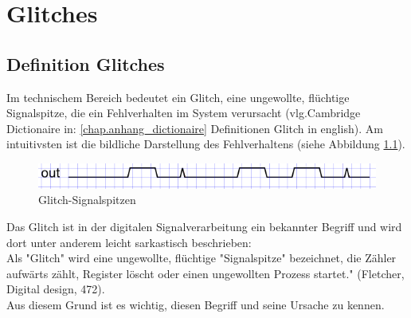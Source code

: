 
\chapter{Glitches}\label{chap.glitch}

\section{Definition Glitches}\label{sect.glitch_def}
Im technischem Bereich bedeutet ein Glitch, eine ungewollte, flüchtige Signalspitze, die ein Fehlverhalten im System verursacht (vlg.Cambridge Dictionaire in: \ref{chap.anhang_dictionaire} Definitionen Glitch in english).
Am intuitivsten ist die bildliche Darstellung des Fehlverhaltens (siehe Abbildung \ref{fig.glitch.def}).
\begin{figure}[H]
	\centering
	\includegraphics[width=\textwidth]{images/def_glitch_1.png}
	\caption{Glitch-Signalspitzen}
	\label{fig.glitch.def}
\end{figure}


Das Glitch ist in der digitalen Signalverarbeitung ein bekannter Begriff und wird dort unter anderem leicht sarkastisch beschrieben:\\
Als "Glitch" wird eine ungewollte, flüchtige "Signalspitze" bezeichnet, die Zähler aufwärts zählt, Register löscht oder einen ungewollten Prozess startet." (Fletcher, Digital design, 472).\\

Aus diesem Grund ist es wichtig, diesen Begriff und seine Ursache zu kennen.\\


